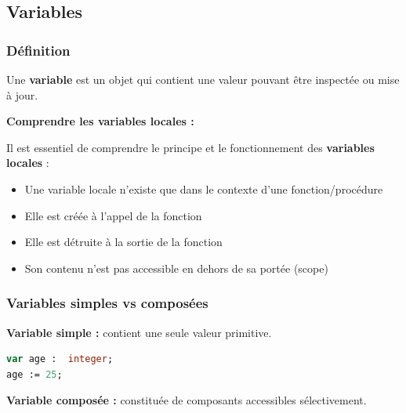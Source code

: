 \documentclass[12pt,a4paper]{article}
\begin{document}
\newpage
\subsection{Variables}

\subsubsection{Définition}

\begin{definition}
Une \textbf{variable} est un objet qui contient une valeur pouvant être inspectée ou mise à jour.
\end{definition}

\begin{notecours}
\textbf{Comprendre les variables locales :}

Il est essentiel de comprendre le principe et le fonctionnement des \textbf{variables locales} : 
\begin{itemize}
    \item Une variable locale n'existe que dans le contexte d'une fonction/procédure
    \item Elle est créée à l'appel de la fonction
    \item Elle est détruite à la sortie de la fonction
    \item Son contenu n'est pas accessible en dehors de sa portée (scope)
\end{itemize}
\end{notecours}

\subsubsection{Variables simples vs composées}

\begin{important}
\textbf{Variable simple : } contient une seule valeur primitive. 
\end{important}

\begin{exemple}
\begin{lstlisting}[language=Pascal]
var age :  integer;
age := 25;
\end{lstlisting}
\end{exemple}

\vspace{1em}

\begin{important}
\textbf{Variable composée :} constituée de composants accessibles sélectivement.
\end{important}
\end{document}
